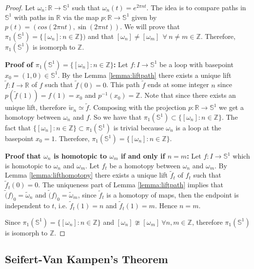 \documentclass[12pt]{article}
\begin{document}
\begin{proof}
	Let \(\omega_n : \mathbb{R} \to \mathbb{S}^1\) such that \(\omega_n(t) = e^{2\pi nt}\). The idea is to compare paths in \(\mathbb{S}^1\) with paths in \(\mathbb{R}\) via the map \(p : \mathbb{R} \rightarrow \mathbb{S}^1\) given by \(p(t) = (cos(2\pi n t), \sin(2\pi n t))\). We will prove that \(\pi_1(\mathbb{S}^1) = \{[\omega_n] : n \in \mathbb{Z}\})\) and that \([\omega_n] \neq [\omega_m] \ \ \forall \ n \neq m \in \mathbb{Z}\). Therefore, \(\pi_1(\mathbb{S}^1)\) is isomorph to \(\mathbb{Z}\).

	\textbf{Proof of \(\pi_1(\mathbb{S}^1) = \{[\omega_n] : n \in \mathbb{Z}\}\):} Let \(f : I \to \mathbb{S}^1\) be a loop with basepoint \(x_0 = (1, 0) \in \mathbb{S}^1\). By the Lemma \ref{lemma:liftpath} there exists a unique lift \(\tilde{f} : I \to \mathbb{R}\) of \(f\) such that \(\tilde{f}(0) = 0\). This path \(\tilde{f}\) ends at some integer \(n\) since \(p(\tilde{f}(1)) = f(1) = x_0\) and \(p^{-1}(x_0) = \mathbb{Z}\). Note that since there exists an unique lift, therefore \(\tilde{w}_n \simeq \tilde{f}\). Composing with the projection \(p : \mathbb{R} \to \mathbb{S}^1\) we get a homotopy between \(\omega_n\) and \(f\). So we have that \(\pi_1(\mathbb{S}^1) \subset \{[\omega_n] : n \in \mathbb{Z}\}\). The fact that \(\{[\omega_n] : n \in \mathbb{Z}\} \subset \pi_1(\mathbb{S}^1)\) is trivial because \(\omega_n\) is a loop at the basepoint \(x_0 = 1\). Therefore, \(\pi_1(\mathbb{S}^1) = \{[\omega_n] : n \in \mathbb{Z}\}\).

	\textbf{Proof that \(\omega_n\) is homotopic to \(\omega_m\) if and only if \(n = m\):} Let \(f : I \to \mathbb{S}^1\) which is homotopic to \(\omega_n\) and \(\omega_m\). Let \(f_t\) be a homotopy between \(\omega_n\) and \(\omega_m\). By Lemma \ref{lemma:lifthomotopy} there exists a unique lift \(\tilde{f}_t\) of \(f_t\) such that \(\tilde{f}_t(0) = 0\). The uniqueness part of Lemma \ref{lemma:liftpath} implies that  \(\tilde(f)_0 = \tilde{\omega}_n\) and \(\tilde(f)_0 = \tilde{\omega}_m\), since \(\tilde{f}_t\) is a homotopy of maps, then the endpoint is independent to \(t\), i.e. \(\tilde{f}_t(1) = n\) and \(\tilde{f}_t(1) = m\). Hence \(n = m\).

	Since \(\pi_1(\mathbb{S}^1) = \{[\omega_n] : n \in \mathbb{Z}\}\) and \([\omega_n] \ncong  [\omega_m] \ \forall n, m \in \mathbb{Z}\), therefore \(\pi_1(\mathbb{S}^1)\) is isomorph to \(\mathbb{Z}\).
\end{proof}

\subsection{Seifert-Van Kampen's Theorem}
\end{document}
